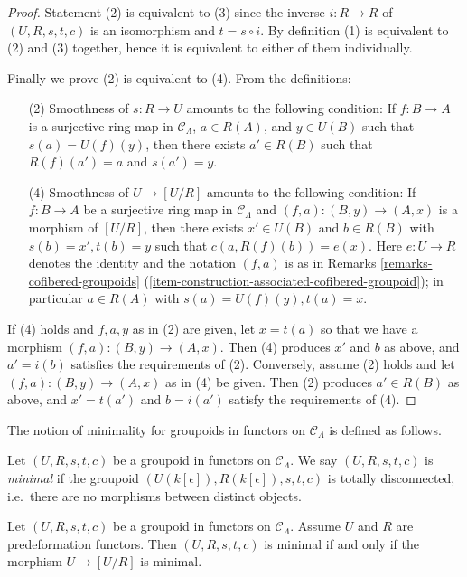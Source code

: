 \begin{proof}
Statement (2) is equivalent to (3) since the inverse $i: R \to R$ of 
$(U, R, s,t,c)$ is an isomorphism and $t = s \circ i$. By definition (1) is 
equivalent to (2) and (3) together, hence it is equivalent to either of them 
individually. 

\medskip \noindent
Finally we prove (2) is equivalent to (4). From the definitions:
\begin{enumerate}
\item[(2)] Smoothness of $s: R \to U$ amounts to the following 
condition: If $f: B \to A$ is a surjective ring map in $\mathcal 
C_\Lambda$, $a \in R(A)$, and $y \in U(B)$ such that $s(a) = U(f)(y)$, then 
there exists $a' \in R(B)$ such that $R(f)(a') = a$ and $s(a') = y$.

\item[(4)] Smoothness of $U \to [U/R]$ amounts to the following 
condition: If $f: B \to A$ be a surjective ring map in $\mathcal 
C_\Lambda$ and $(f,a): (B,y) \to (A,x)$ is a morphism of $[U/R]$, 
then there exists $x' \in U(B)$ and $b \in R(B)$ with $s(b) = x', t(b) = y$ 
such that $c(a,R(f)(b)) = e(x)$.  Here $e: U \to R$ denotes the 
identity and the notation $(f,a)$ is as in Remarks 
\ref{remarks-cofibered-groupoids} 
(\ref{item-construction-associated-cofibered-groupoid});
in particular $a \in R(A)$ with $s(a) = U(f)(y), t(a) = x$.  
\end{enumerate}
If (4) holds and $f,a,y$ as in (2) are given, let $x = t(a)$ so that we have a 
morphism $(f,a): (B,y) \to (A,x)$.  Then (4) produces $x'$ and $b$ as 
above, and $a' = i(b)$ satisfies the requirements of (2).  Conversely, assume 
(2) holds and let $(f,a): (B,y) \to (A,x)$ as in (4) be given.  Then 
(2) produces $a' \in R(B)$ as above, and $x' = t(a')$ and $b = i(a')$ satisfy 
the requirements of (4).
\end{proof}

\noindent
The notion of minimality for groupoids in functors on $\mathcal{C}_\Lambda$ is 
defined as follows.

\begin{definition}
\label{definition-minimal-groupoid-in-functors}
Let $(U, R, s,t,c)$ be a groupoid in functors on $\mathcal{C}_\Lambda$.  We 
say $(U, R, s,t,c)$ is {\it minimal} if the groupoid 
$(U(k[\epsilon]),R(k[\epsilon]), s,t,c)$ is totally disconnected, i.e.\ 
there are no morphisms between distinct objects.
\end{definition}

\begin{lemma}
\label{lemma-characterize-minimal-groupoid-in-functors}
Let $(U, R, s,t,c)$ be a groupoid in functors on $\mathcal{C}_\Lambda$.  
Assume $U$ and $R$ are predeformation functors.  Then $(U,R,s,t,c)$ is minimal 
if and only if the morphism $U \to [U/R]$ is minimal.
\end{lemma}

